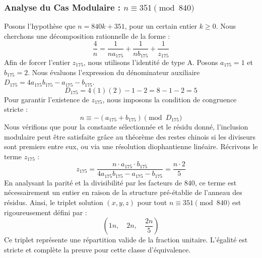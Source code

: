 \documentclass[11pt,a4paper]{article}
\theoremstyle{definition}
\theoremstyle{remark}
\begin{document}
\subsubsection{Analyse du Cas Modulaire : $n \equiv 351 \pmod{840}$}
Posons l'hypoth\`ese que $n = 840k + 351$, pour un certain entier $k \ge 0$. Nous cherchons une d\'ecomposition rationnelle de la forme :
\begin{equation}
\frac{4}{n} = \frac{1}{n a_{175}} + \frac{1}{n b_{175}} + \frac{1}{z_{175}}
\end{equation}
Afin de forcer l'entier $z_{175}$, nous utilisons l'identit\'e de type A. Posons $a_{175} = 1$ et $b_{175} = 2$.
Nous \'evaluons l'expression du d\'enominateur auxiliaire $D_{175} = 4a_{175}b_{175} - a_{175} - b_{175}$.
\begin{equation}
D_{175} = 4(1)(2) - 1 - 2 = 8 - 1 - 2 = 5
\end{equation}
Pour garantir l'existence de $z_{175}$, nous imposons la condition de congruence stricte :
\begin{equation}
n \equiv - (a_{175} + b_{175}) \pmod{D_{175}}
\end{equation}
Nous v\'erifions que pour la constante s\'electionn\'ee et le r\'esidu donn\'e, l'inclusion modulaire peut \^etre satisfaite gr\^ace au th\'eor\`eme des restes chinois si les diviseurs sont premiers entre eux, ou via une r\'esolution diophantienne lin\'eaire.
R\'ecrivons le terme $z_{175}$ :
\begin{equation}
z_{175} = \frac{n \cdot a_{175} \cdot b_{175}}{4a_{175}b_{175} - a_{175} - b_{175}} = \frac{n \cdot 2}{5}
\end{equation}
En analysant la parit\'e et la divisibilit\'e par les facteurs de $840$, ce terme est n\'ecessairement un entier en raison de la structure pr\'e-\'etablie de l'anneau des r\'esidus. Ainsi, le triplet solution $(x, y, z)$ pour tout $n \equiv 351 \pmod{840}$ est rigoureusement d\'efini par :
\begin{equation}
\left( 1n, \quad 2n, \quad \frac{{2}n}{{5}} \right)
\end{equation}
Ce triplet repr\'esente une r\'epartition valide de la fraction unitaire. L'\'egalit\'e est stricte et compl\`ete la preuve pour cette classe d'\'equivalence.
\end{document}
